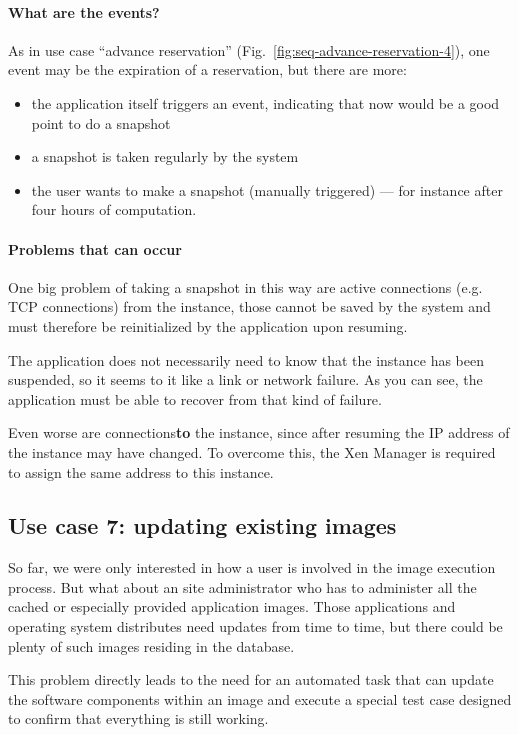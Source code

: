 \paragraph{What are the events?}

As        in         use        case        ``advance        reservation''
(Fig.~\ref{fig:seq-advance-reservation-4}),   one   event   may   be   the
expiration of a reservation, but there are more:

\begin{itemize}
\item the application itself triggers  an event, indicating that now would
  be a good point to do a snapshot
\item a snapshot is taken regularly by the system
\item  the user  wants to  make a  snapshot (manually  triggered)  --- for
  instance after four hours of computation.
\end{itemize}


\paragraph{Problems that can occur}

One big  problem of taking a  snapshot in this way  are active connections
(e.g.  TCP  connections) from the instance,  those cannot be  saved by the
system  and  must  therefore  be  reinitialized by  the  application  upon
resuming.

The application  does not necessarily need  to know that  the instance has
been suspended, so it  seems to it like a link or  network failure. As you
can  see, the  application  must be  able  to recover  from  that kind  of
failure.

Even worse are connections{\bf to}  the instance, since after resuming the
IP address  of the instance  may have changed.  To overcome this,  the Xen
Manager is required to assign the same address to this instance.

\subsection{Use case 7: updating existing images}

So far,  we were only interested  in how a  user is involved in  the image
execution  process.  But  what  about  an site  administrator  who has  to
administer all the cached or especially provided application images. Those
applications and  operating system distributes  need updates from  time to
time, but there could be plenty of such images residing in the database.

This problem  directly leads to  the need for  an automated task  that can
update the software components within  an image and execute a special test
case designed to confirm that everything is still working.

